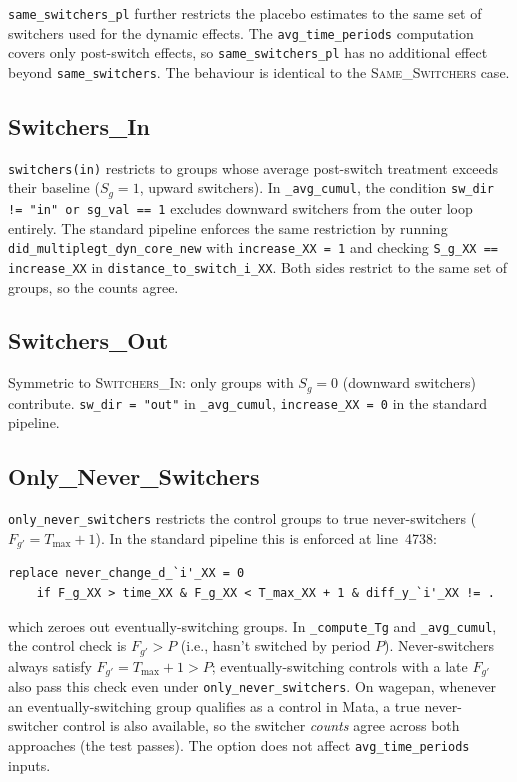 \documentclass[11pt]{article}
\begin{document}
\texttt{same\_switch\-ers\_pl} further restricts the placebo estimates to the
same set of switchers used for the dynamic effects. The
\texttt{avg\_time\_periods} computation covers only post-switch effects, so
\texttt{same\_switch\-ers\_pl} has no additional effect beyond
\texttt{same\_switch\-ers}. The behaviour is identical to the
\textsc{Same\_Switchers} case.

\subsection{Switchers\_In}

\texttt{switchers(in)} restricts to groups whose average post-switch treatment
exceeds their baseline ($S_g = 1$, upward switchers). In \texttt{\_avg\_cumul},
the condition \texttt{sw\_dir != "in" or sg\_val == 1} excludes downward
switchers from the outer loop entirely. The standard pipeline enforces the same
restriction by running \texttt{did\_multiplegt\_dyn\_core\_new} with
\texttt{increase\_XX = 1} and checking \texttt{S\_g\_XX == increase\_XX} in
\texttt{distance\_to\_switch\_i\_XX}. Both sides restrict to the same set of
groups, so the counts agree.

\subsection{Switchers\_Out}

Symmetric to \textsc{Switchers\_In}: only groups with $S_g = 0$ (downward
switchers) contribute. \texttt{sw\_dir = "out"} in \texttt{\_avg\_cumul},
\texttt{increase\_XX = 0} in the standard pipeline.

\subsection{Only\_Never\_Switchers}

\texttt{only\_never\_switchers} restricts the control groups to true
never-switchers ($F_{g'} = T_{\max}+1$). In the standard pipeline this is
enforced at line~4738:

\begin{lstlisting}[language={}]
replace never_change_d_`i'_XX = 0
    if F_g_XX > time_XX & F_g_XX < T_max_XX + 1 & diff_y_`i'_XX != .
\end{lstlisting}

which zeroes out eventually-switching groups. In \texttt{\_compute\_Tg} and
\texttt{\_avg\_cumul}, the control check is $F_{g'} > P$ (i.e., hasn't
switched by period $P$). Never-switchers always satisfy $F_{g'} = T_{\max}+1
> P$; eventually-switching controls with a late $F_{g'}$ also pass this check
even under \texttt{only\_never\_switchers}. On wagepan, whenever an
eventually-switching group qualifies as a control in Mata, a true
never-switcher control is also available, so the switcher \emph{counts} agree
across both approaches (the test passes). The option does not affect
\texttt{avg\_time\_periods} inputs.
\end{document}
